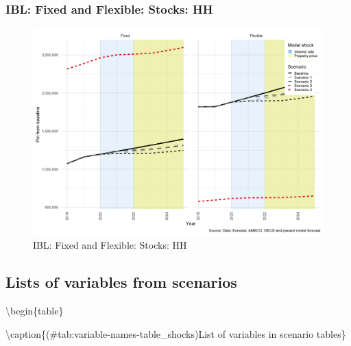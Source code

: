 \documentclass[
]{book}
\begin{document}
\hypertarget{ibl-fixed-and-flexible-stocks-hh}{%
\subsubsection{IBL: Fixed and Flexible: Stocks: HH}\label{ibl-fixed-and-flexible-stocks-hh}}

\begin{figure}[H]
\includegraphics[width=0.95\linewidth]{figures/fl-fi-sfc-plot-ibl-h-1} \caption{IBL: Fixed and Flexible: Stocks: HH}\label{fig:fl-fi-sfc-plot-ibl-h}
\end{figure}

\hypertarget{sec:list-of-variables-shocks}{%
\subsection{Lists of variables from scenarios}\label{sec:list-of-variables-shocks}}

\textbackslash begin\{table\}

\textbackslash caption\{(\#tab:variable-names-table\_shocks)List of variables in scenario tables\}
\centering
\fontsize{10}{12}\selectfont
\end{document}
